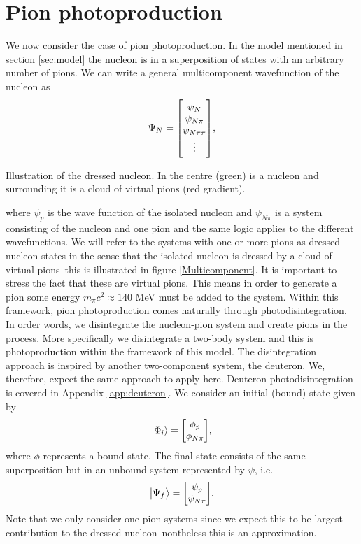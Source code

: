 \chapter{Pion photoproduction}\label{sec:PionPhotoproduction}

We now consider the case of pion photoproduction. In the model mentioned in section \ref{sec:model} the nucleon is in a superposition of states with an arbitrary number of pions. We can write a general multicomponent wavefunction of the nucleon as 
\begin{equation}
    \Psi_N = \mqty[\psi_N \\ \psi_{N\pi} \\
    \psi_{N\pi \pi} \\
    \vdots],
\end{equation}
\begin{marginfigure}
\centering

\caption{Illustration of the dressed nucleon. In the centre (green) is a nucleon and surrounding it is a cloud of virtual pions (red gradient). }
\label{Multicomponent}
\end{marginfigure}
where $\psi_p$ is the wave function of the isolated nucleon and $\psi_{N\pi}$ is a system consisting of the nucleon and one pion and the same logic applies to the different wavefunctions. We will refer to the systems with one or more pions as dressed nucleon states in the sense that the isolated nucleon is dressed by a cloud of virtual pions--this is illustrated in figure \ref{Multicomponent}. It is important to stress the fact that these are virtual pions. This means in order to generate a pion some energy $ m_\pi c^2 \approx 140$ MeV must be added to the system. Within this framework, pion photoproduction comes naturally through photodisintegration. In order words, we disintegrate the nucleon-pion system and create pions in the process. More specifically we disintegrate a two-body system and this is photoproduction within the framework of this model. The disintegration approach is inspired by another two-component system, the deuteron. We, therefore, expect the same approach to apply here. Deuteron photodisintegration is covered in Appendix \ref{app:deuteron}. We consider an initial (bound) state given by
\begin{equation} \label{phii}
    \ket{\Phi_i} = \mqty[\phi_p \\ \phi_{N\pi}],
\end{equation}
where $\phi$ represents a bound state. The final state consists of the same superposition but in an unbound system represented by $\psi$, i.e.
\begin{equation} \label{psif}
    \ket{\Psi_f} = \mqty[\psi_p \\ \psi_{N\pi}].
\end{equation}
Note that we only consider one-pion systems since we expect this to be largest contribution to the dressed nucleon--nontheless this is an approximation. 
